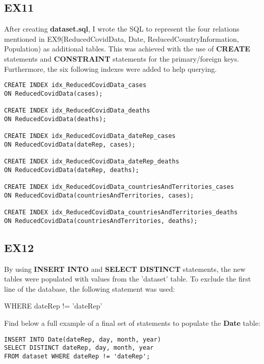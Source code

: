 \documentclass{article}
\begin{document}
\subsection{EX11}

After creating \textbf{dataset.sql}, I wrote the SQL to represent the four relations mentioned in EX9(ReducedCovidData, Date, ReducedCountryInformation, Population) as additional tables. This was achieved with the use of \textbf{CREATE} statements and \textbf{CONSTRAINT} statements for the primary/foreign keys. Furthermore, the six following indexes were added to help querying.

\begin{lstlisting}[caption={Indexes for querying}]
CREATE INDEX idx_ReducedCovidData_cases
ON ReducedCovidData(cases);

CREATE INDEX idx_ReducedCovidData_deaths
ON ReducedCovidData(deaths);

CREATE INDEX idx_ReducedCovidData_dateRep_cases
ON ReducedCovidData(dateRep, cases);

CREATE INDEX idx_ReducedCovidData_dateRep_deaths
ON ReducedCovidData(dateRep, deaths);

CREATE INDEX idx_ReducedCovidData_countriesAndTerritories_cases
ON ReducedCovidData(countriesAndTerritories, cases);

CREATE INDEX idx_ReducedCovidData_countriesAndTerritories_deaths
ON ReducedCovidData(countriesAndTerritories, deaths);
\end{lstlisting}

\subsection{EX12}

By using \textbf{INSERT INTO} and \textbf{SELECT DISTINCT} statements, the new tables were populated with values from the 'dataset' table. To exclude the first line of the database, the following statement was used:

\begin{center}
    WHERE dateRep != 'dateRep'
\end{center}

Find below a full example of a final set of statements to populate the \textbf{Date} table:

\begin{lstlisting}[caption={Date Table Statements}]
INSERT INTO Date(dateRep, day, month, year)
SELECT DISTINCT dateRep, day, month, year
FROM dataset WHERE dateRep != 'dateRep';
\end{lstlisting}
\end{document}

